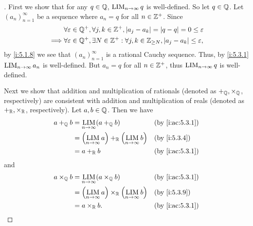 \begin{proof}[]
  First we show that for any \(q \in \mathbb{Q}\), \(\operatorname*{LIM}_{n \to \infty} q\) is well-defined.
  So let \(q \in \mathbb{Q}\).
  Let \((a_n)_{n = 1}^\infty\) be a sequence where \(a_n = q\) for all \(n \in \mathbb{Z}^+\).
  Since
  \begin{align*}
             & \forall \varepsilon \in \mathbb{Q}^+, \forall j, k \in \mathbb{Z}^+, \left\lvert a_j - a_k\right\rvert = \left\lvert q - q\right\rvert = 0 \leq \varepsilon            \\
    \implies & \forall \varepsilon \in \mathbb{Q}^+, \exists N \in \mathbb{Z}^+ : \forall j, k \in \mathbb{Z}_{\geq N}, \left\lvert a_j - a_k\right\rvert \leq \varepsilon,
  \end{align*}
  by \cref{i:5.1.8} we see that \((a_n)_{n = 1}^\infty\) is a rational Cauchy sequence.
  Thus, by \cref{i:5.3.1} \(\operatorname*{LIM}_{n \to \infty} a_n\) is well-defined.
  But \(a_n = q\) for all \(n \in \mathbb{Z}^+\), thus \(\operatorname*{LIM}_{n \to \infty} q\) is well-defined.

  Next we show that addition and multiplication of rationals (denoted as \(+_{\mathbb{Q}}, \times_{\mathbb{Q}}\), respectively) are consistent with addition and multiplication of reals (denoted as \(+_{\mathbb{R}}, \times_{\mathbb{R}}\), respectively).
  Let \(a, b \in \mathbb{Q}\).
  Then we have
  \begin{align*}
    a +_\Q b & = \LIM_{n \to \infty} (a +_\Q b)                             &  & \by{i:ac:5.3.1} \\
             & = \pa{\LIM_{n \to \infty} a} +_\R \pa{\LIM_{n \to \infty} b} &  & \by{i:5.3.4}    \\
             & = a +_\R b                                                   &  & \by{i:ac:5.3.1}
  \end{align*}
  and
  \begin{align*}
    a \times_\Q b & = \LIM_{n \to \infty} (a \times_\Q b)                             &  & \by{i:ac:5.3.1} \\
                  & = \pa{\LIM_{n \to \infty} a} \times_\R \pa{\LIM_{n \to \infty} b} &  & \by{i:5.3.9}    \\
                  & = a \times_\R b.                                                  &  & \by{i:ac:5.3.1}
  \end{align*}


\end{proof}
